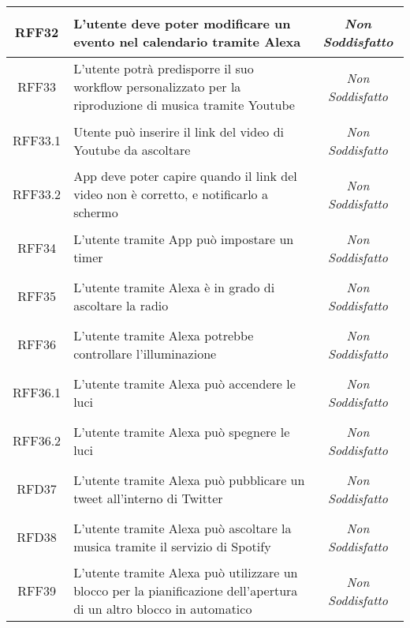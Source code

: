 \begin{longtable}{|c|>{\centering}m{7cm}|c|}
	\hypertarget{RFF32}{RFF32} & L'utente deve poter modificare un evento nel calendario tramite Alexa & \textit{Non Soddisfatto}\\ \hline
	
	\hypertarget{RFF33}{RFF33} & L'utente potrà predisporre il suo workflow personalizzato per la riproduzione di musica tramite Youtube & \textit{Non Soddisfatto}\\ \hline
	
	\hypertarget{RFF33.1}{RFF33.1} & Utente può inserire il link del video di Youtube da ascoltare & \textit{Non Soddisfatto}\\ \hline
	
	\hypertarget{RFF33.2}{RFF33.2} & App deve poter capire quando il link del video non è corretto, e notificarlo a schermo & \textit{Non Soddisfatto}\\ \hline
	
	\hypertarget{RFF34}{RFF34} & L'utente tramite App può impostare un timer & \textit{Non Soddisfatto}\\ \hline
	
	\hypertarget{RFF35}{RFF35} & L'utente tramite Alexa è in grado di ascoltare la radio & \textit{Non Soddisfatto}\\ \hline
	
	\hypertarget{RFF36}{RFF36} & L'utente tramite Alexa potrebbe controllare l'illuminazione & \textit{Non Soddisfatto}\\ \hline
	
	\hypertarget{RFF36.1}{RFF36.1} & L'utente tramite Alexa può accendere le luci & \textit{Non Soddisfatto}\\ \hline
	
	\hypertarget{RFF36.2}{RFF36.2} & L'utente tramite Alexa può spegnere le luci & \textit{Non Soddisfatto}\\ \hline
	
	\hypertarget{RFD37}{RFD37} & L'utente tramite Alexa può pubblicare un tweet all'interno di Twitter & \textit{Non Soddisfatto}\\ \hline
	
	\hypertarget{RFD38}{RFD38} & L'utente tramite Alexa può ascoltare la musica tramite il servizio di Spotify & \textit{Non Soddisfatto}\\ \hline
	
	\hypertarget{RFF39}{RFF39} & L'utente tramite Alexa può utilizzare un blocco per la pianificazione dell'apertura di un altro blocco in automatico & \textit{Non Soddisfatto}\\ \hline
	

\end{longtable}
